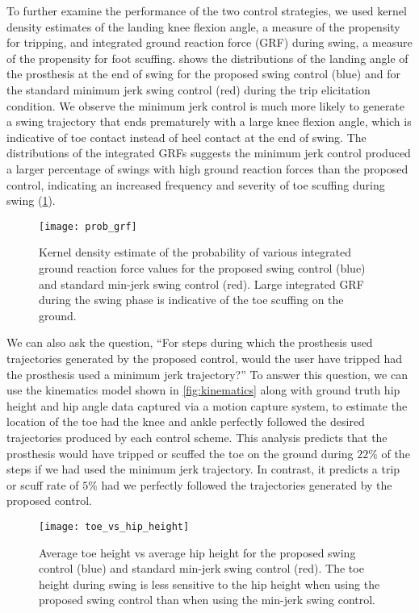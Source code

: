 To further examine the performance of the two control strategies, we used kernel
density estimates of the landing knee flexion angle, a measure of the propensity
for tripping, and integrated ground reaction force (GRF) during swing, a measure
of the propensity for foot scuffing.  shows the
distributions of the landing angle of the prosthesis at the end of swing for the
proposed swing control (blue) and for the standard minimum jerk swing control
(red) during the trip elicitation condition. We observe the minimum jerk control
is much more likely to generate a swing trajectory that ends prematurely with a
large knee flexion angle, which is indicative of toe contact instead of heel
contact at the end of swing.  The distributions of the integrated GRFs suggests
the minimum jerk control produced a larger percentage of swings with high ground
reaction forces than the proposed control, indicating an increased frequency and
severity of toe scuffing during swing (\cref{fig:p_grf}). 
\begin{figure}[t]
    \centering
    \texttt{[image: prob\_grf]}
    \caption[Kernel density estimate of the probability of integrated ground
    reaction force]{Kernel density estimate of the probability of various
    integrated ground reaction force values for the proposed swing control
    (blue) and standard min-jerk swing control (red). Large integrated GRF
    during the swing phase is indicative of the toe scuffing on the
    ground.}\label{fig:p_grf}
\end{figure}

We can also ask the question, ``For steps during which the prosthesis used
trajectories generated by the proposed control, would the user have tripped had
the prosthesis used a minimum jerk trajectory?'' To answer this question, we can
use the kinematics model shown in \cref{fig:kinematics} along with ground truth
hip height and hip angle data captured via a motion capture system, to estimate
the location of the toe had the knee and ankle perfectly followed the desired
trajectories produced by each control scheme. This analysis predicts that the
prosthesis would have tripped or scuffed the toe on the ground during $22\%$ of
the steps if we had used the minimum jerk trajectory. In contrast, it predicts a
trip or scuff rate of $5\%$ had we perfectly followed the trajectories generated
by the proposed control.

\begin{figure}[t]
    \centering
    \texttt{[image: toe\_vs\_hip\_height]}
    \caption[Average toe height vs average hip height]{Average toe height vs
    average hip height for the proposed swing control (blue) and standard
    min-jerk swing control (red). The toe height during swing is less sensitive
    to the hip height when using the proposed swing control than when using the
    min-jerk swing control.}\label{fig:toe_vs_hip}
\end{figure}

